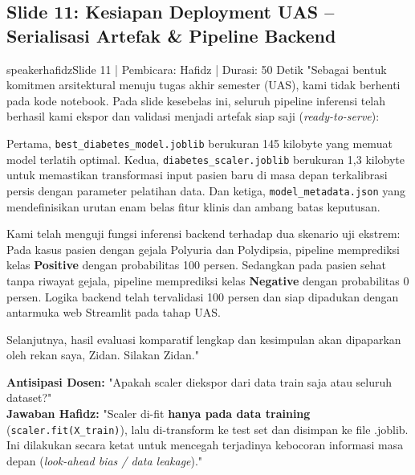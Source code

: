 \documentclass[11pt,a4paper]{article}
\begin{document}
\subsection{Slide 11: Kesiapan Deployment UAS -- Serialisasi Artefak \& Pipeline Backend}
\begin{scriptbox}{speakerhafidz}{Slide 11 | Pembicara: Hafidz | Durasi: 50 Detik}
"Sebagai bentuk komitmen arsitektural menuju tugas akhir semester (UAS), kami tidak berhenti pada kode notebook. Pada slide kesebelas ini, seluruh pipeline inferensi telah berhasil kami ekspor dan validasi menjadi artefak siap saji (\textit{ready-to-serve}):

Pertama, \texttt{best\_diabetes\_model.joblib} berukuran 145 kilobyte yang memuat model terlatih optimal.
Kedua, \texttt{diabetes\_scaler.joblib} berukuran 1,3 kilobyte untuk memastikan transformasi input pasien baru di masa depan terkalibrasi persis dengan parameter pelatihan data.
Dan ketiga, \texttt{model\_metadata.json} yang mendefinisikan urutan enam belas fitur klinis dan ambang batas keputusan.

Kami telah menguji fungsi inferensi backend terhadap dua skenario uji ekstrem:
Pada kasus pasien dengan gejala Polyuria dan Polydipsia, pipeline memprediksi kelas \textbf{Positive} dengan probabilitas 100 persen.
Sedangkan pada pasien sehat tanpa riwayat gejala, pipeline memprediksi kelas \textbf{Negative} dengan probabilitas 0 persen.
Logika backend telah tervalidasi 100 persen dan siap dipadukan dengan antarmuka web Streamlit pada tahap UAS.

Selanjutnya, hasil evaluasi komparatif lengkap dan kesimpulan akan dipaparkan oleh rekan saya, Zidan. Silakan Zidan."
\end{scriptbox}

\begin{defensebox}
\textbf{Antisipasi Dosen:} "Apakah scaler diekspor dari data train saja atau seluruh dataset?"\\
\textbf{Jawaban Hafidz:} "Scaler di-fit \textbf{hanya pada data training} (\texttt{scaler.fit(X\_train)}), lalu di-transform ke test set dan disimpan ke file .joblib. Ini dilakukan secara ketat untuk mencegah terjadinya kebocoran informasi masa depan (\textit{look-ahead bias / data leakage})."
\end{defensebox}

\newpage

\end{document}
